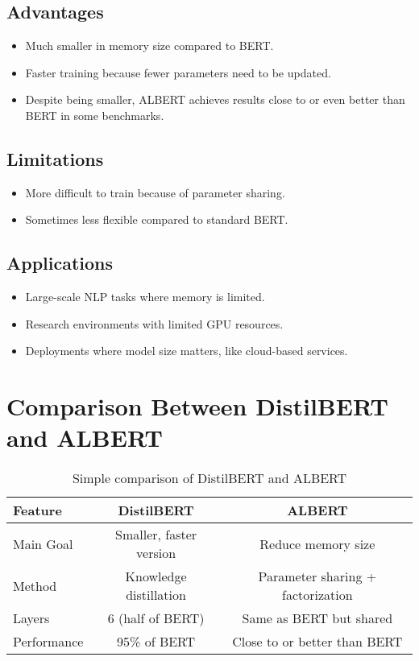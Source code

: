 \documentclass[11pt]{article}
\begin{document}
\subsection{Advantages}
\begin{itemize}
    \item Much smaller in memory size compared to BERT.
    \item Faster training because fewer parameters need to be updated.
    \item Despite being smaller, ALBERT achieves results close to or even better than BERT in some benchmarks.
\end{itemize}

\subsection{Limitations}
\begin{itemize}
    \item More difficult to train because of parameter sharing.
    \item Sometimes less flexible compared to standard BERT.
\end{itemize}

\subsection{Applications}
\begin{itemize}
    \item Large-scale NLP tasks where memory is limited.
    \item Research environments with limited GPU resources.
    \item Deployments where model size matters, like cloud-based services.
\end{itemize}

\section{Comparison Between DistilBERT and ALBERT}
\begin{table}[h]
\centering
\begin{tabular}{lcc}
\toprule
\textbf{Feature} & \textbf{DistilBERT} & \textbf{ALBERT} \\
\midrule
Main Goal & Smaller, faster version & Reduce memory size \\
Method & Knowledge distillation & Parameter sharing + factorization \\
Layers & 6 (half of BERT) & Same as BERT but shared \\
Performance & 95\% of BERT & Close to or better than BERT \\
\bottomrule
\end{tabular}
\caption{Simple comparison of DistilBERT and ALBERT}
\end{table}
\end{document}
